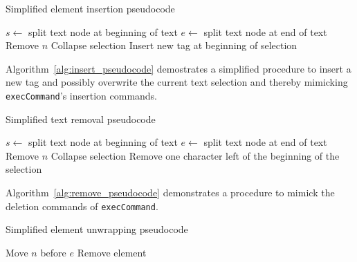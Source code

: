
\begin{algorithm}
\caption{Simplified element insertion pseudocode}
\label{alg:insert_pseudocode}
\begin{algorithmic}[1]
  \State $s \gets$ split text node at beginning of text
  \State $e \gets$ split text node at end of text
    \State Remove $n$
  \EndFor
  \State Collapse selection
\EndIf
\State Insert new tag at beginning of selection
\EndProcedure
\end{algorithmic}
\end{algorithm}

Algorithm~\ref{alg:insert_pseudocode} demostrates a simplified procedure to insert a new tag and possibly overwrite the current text selection and thereby mimicking \texttt{execCommand}'s insertion commands.

\begin{algorithm}
\caption{Simplified text removal pseudocode}
\label{alg:remove_pseudocode}
\begin{algorithmic}[1]
  \State $s \gets$ split text node at beginning of text
  \State $e \gets$ split text node at end of text
    \State Remove $n$
  \EndFor
  \State Collapse selection
\Else
  \State Remove one character left of the beginning of the selection
\EndIf
\EndProcedure
\end{algorithmic}
\end{algorithm}

Algorithm~\ref{alg:remove_pseudocode} demonstrates a procedure to mimick the deletion commands of \texttt{execCommand}.

\begin{algorithm}
\caption{Simplified element unwrapping pseudocode}
\label{alg:unwrap_pseudocode}
\begin{algorithmic}[1]
    \State Move $n$ before $e$
  \EndFor
\EndProcedure
\State Remove element
\end{algorithmic}
\end{algorithm}


